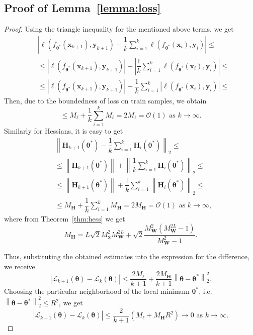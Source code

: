 \documentclass{article}
\begin{document}
\subsection{Proof of Lemma~\ref{lemma:loss}}\label{app:lemma:loss}
\begin{proof}
    Using the triangle inequality for the mentioned above terms, we get
    \begin{align*}
        & \left| \ell(f_{\boldsymbol{\theta}^*}(\mathbf{x}_{k+1}), \mathbf{y}_{k+1}) - \dfrac{1}{k} \sum\limits_{i=1}^{k} \ell(f_{\boldsymbol{\theta}^*}(\mathbf{x}_{i}), \mathbf{y}_{i}) \right| \leqslant \\
        & \leqslant \left| \ell(f_{\boldsymbol{\theta}^*}(\mathbf{x}_{k+1}), \mathbf{y}_{k+1}) \right| + \left| \dfrac{1}{k} \sum\limits_{i=1}^{k} \ell(f_{\boldsymbol{\theta}^*}(\mathbf{x}_{i}), \mathbf{y}_{i}) \right| \leqslant \\
        & \leqslant \left| \ell(f_{\boldsymbol{\theta}^*}(\mathbf{x}_{k+1}), \mathbf{y}_{k+1}) \right| + \dfrac{1}{k} \sum\limits_{i=1}^{k} \left| \ell(f_{\boldsymbol{\theta}^*}(\mathbf{x}_{i}), \mathbf{y}_{i}) \right| \leqslant
    \end{align*}
    Then, due to the boundedness of loss on train samples, we obtain
    \[ \leqslant M_{\ell} + \dfrac{1}{k} \sum\limits_{i=1}^{k} M_{\ell} = 2M_{\ell} = \mathcal{O}(1) \text{ as } k \to \infty. \]
    Similarly for Hessians, it is easy to get
    \begin{align*}
        & \left\| \mathbf{H}_{k+1}(\boldsymbol{\theta}^*) - \dfrac{1}{k} \sum\limits_{i=1}^{k} \mathbf{H}_{i}(\boldsymbol{\theta}^*) \right\|_2 \leqslant \\
        & \leqslant \left\| \mathbf{H}_{k+1}(\boldsymbol{\theta}^*) \right\| + \left\| \dfrac{1}{k} \sum\limits_{i=1}^{k} \mathbf{H}_{i}(\boldsymbol{\theta}^*) \right\|_2 \leqslant \\
        & \leqslant \left\| \mathbf{H}_{k+1}(\boldsymbol{\theta}^*) \right\| + \dfrac{1}{k} \sum\limits_{i=1}^{k} \left\| \mathbf{H}_{i}(\boldsymbol{\theta}^*) \right\|_2 \leqslant \\
        & \leqslant M_{\mathbf{H}} + \dfrac{1}{k} \sum\limits_{i=1}^{k} M_{\mathbf{H}} = 2 M_{\mathbf{H}} = \mathcal{O}(1) \text{ as } k \to \infty,
    \end{align*}
    where from Theorem~\ref{thm:hess} we get
    \[ M_{\mathbf{H}} = L \sqrt{2} M_{\mathbf{x}}^2 M_{\mathbf{W}}^{2L} + \sqrt{2} \dfrac{M_{\mathbf{W}}^2 (M_{\mathbf{W}}^{2L} - 1)}{M_{\mathbf{W}}^2 - 1}. \]
    
    Thus, substituting the obtained estimates into the expression for the difference, we receive
    \[ \left| \mathcal{L}_{k+1}(\boldsymbol{\theta}) - \mathcal{L}_k(\boldsymbol{\theta}) \right| \leqslant \dfrac{2M_{\ell}}{k+1} + \dfrac{2M_{\mathbf{H}}}{k+1} \left\|\boldsymbol{\theta} - \boldsymbol{\theta}^*\right\|_2^2. \]
    Choosing the particular neighborhood of the local minimum $\boldsymbol{\theta}^*$, i.e. $\left\|\boldsymbol{\theta} - \boldsymbol{\theta}^*\right\|_2^2 \leqslant R^2$, we get
    \[ \left| \mathcal{L}_{k+1}(\boldsymbol{\theta}) - \mathcal{L}_k(\boldsymbol{\theta}) \right| \leqslant \dfrac{2}{k+1}\left( M_{\ell} + M_{\mathbf{H}}R^2 \right) \to 0 \text{ as } k \to \infty. \]
\end{proof}
\end{document}
